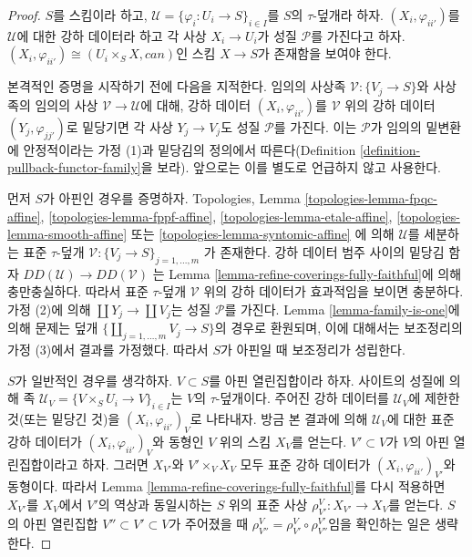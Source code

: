 \begin{proof}
$S$를 스킴이라 하고,
$\mathcal{U} = \{\varphi_i : U_i \to S\}_{i \in I}$를 $S$의
$\tau$-덮개라 하자. $(X_i, \varphi_{ii'})$를 $\mathcal{U}$에 대한 강하
데이터라 하고 각 사상 $X_i \to U_i$가 성질 $\mathcal{P}$를 가진다고
하자. $(X_i, \varphi_{ii'}) \cong (U_i \times_S X, can)$인 스킴
$X \to S$가 존재함을 보여야 한다.

\medskip\noindent
본격적인 증명을 시작하기 전에 다음을 지적한다. 임의의 사상족
$\mathcal{V} : \{V_j \to S\}$와 사상족의 임의의 사상
$\mathcal{V} \to \mathcal{U}$에 대해, 강하 데이터
$(X_i, \varphi_{ii'})$를 $\mathcal{V}$ 위의 강하 데이터
$(Y_j, \varphi_{jj'})$로 밑당기면 각 사상 $Y_j \to V_j$도 성질
$\mathcal{P}$를 가진다. 이는 $\mathcal{P}$가 임의의 밑변환에
안정적이라는 가정 (1)과 밑당김의 정의에서 따른다(Definition
\ref{definition-pullback-functor-family}을 보라). 앞으로는 이를 별도로
언급하지 않고 사용한다.

\medskip\noindent
먼저 $S$가 아핀인 경우를 증명하자. Topologies, Lemma
\ref{topologies-lemma-fpqc-affine},
\ref{topologies-lemma-fppf-affine},
\ref{topologies-lemma-etale-affine},
\ref{topologies-lemma-smooth-affine} 또는
\ref{topologies-lemma-syntomic-affine}
에 의해 $\mathcal{U}$를 세분하는 표준 $\tau$-덮개
$\mathcal{V} : \{V_j \to S\}_{j = 1, \ldots, m}$
가 존재한다. 강하 데이터 범주 사이의 밑당김 함자
$DD(\mathcal{U}) \to DD(\mathcal{V})$
는 Lemma \ref{lemma-refine-coverings-fully-faithful}에 의해 충만충실하다.
따라서 표준 $\tau$-덮개 $\mathcal{V}$ 위의 강하 데이터가 효과적임을
보이면 충분하다. 가정 (2)에 의해 $\coprod Y_j \to \coprod V_j$는 성질
$\mathcal{P}$를 가진다. Lemma \ref{lemma-family-is-one}에 의해 문제는
덮개 $\{\coprod_{j = 1, \ldots, m} V_j \to S\}$의 경우로 환원되며,
이에 대해서는 보조정리의 가정 (3)에서 결과를 가정했다. 따라서 $S$가
아핀일 때 보조정리가 성립한다.

\medskip\noindent
$S$가 일반적인 경우를 생각하자. $V \subset S$를 아핀 열린집합이라 하자.
사이트의 성질에 의해 족
$\mathcal{U}_V = \{V \times_S U_i \to V\}_{i \in I}$는 $V$의
$\tau$-덮개이다. 주어진 강하 데이터를 $\mathcal{U}_V$에 제한한 것(또는
밑당긴 것)을 $(X_i, \varphi_{ii'})_V$로 나타내자. 방금 본 결과에 의해
$\mathcal{U}_V$에 대한 표준 강하 데이터가 $(X_i, \varphi_{ii'})_V$와
동형인 $V$ 위의 스킴 $X_V$를 얻는다. $V' \subset V$가 $V$의 아핀
열린집합이라고 하자. 그러면 $X_{V'}$와 $V' \times_V X_V$ 모두 표준
강하 데이터가 $(X_i, \varphi_{ii'})_{V'}$와 동형이다. 따라서 Lemma
\ref{lemma-refine-coverings-fully-faithful}를 다시 적용하면 $X_{V'}$를
$X_V$에서 $V'$의 역상과 동일시하는 $S$ 위의 표준 사상
$\rho^V_{V'} : X_{V'} \to X_V$를 얻는다. $S$의 아핀 열린집합
$V'' \subset V' \subset V$가 주어졌을 때
$\rho^V_{V''} = \rho^V_{V'} \circ \rho^{V'}_{V''}$임을 확인하는 일은
생략한다.


\end{proof}
